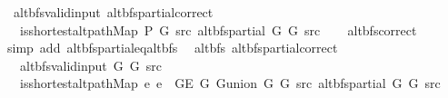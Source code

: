\begin{isabellebody}
\isamarkupfalse%
\ {\isacharparenleft}{\kern0pt}\ alt{\isacharunderscore}{\kern0pt}bfs{\isacharunderscore}{\kern0pt}valid{\isacharunderscore}{\kern0pt}input{\isacharparenright}{\kern0pt}\ alt{\isacharunderscore}{\kern0pt}bfs{\isacharunderscore}{\kern0pt}partial{\isacharunderscore}{\kern0pt}correct{\isacharcolon}{\kern0pt}\isanewline
\ \ \ {\isachardoublequoteopen}is{\isacharunderscore}{\kern0pt}shortest{\isacharunderscore}{\kern0pt}alt{\isacharunderscore}{\kern0pt}path{\isacharunderscore}{\kern0pt}Map\ P{\isacharprime}{\kern0pt}{\isacharprime}{\kern0pt}\ G\ src\ {\isacharparenleft}{\kern0pt}alt{\isacharunderscore}{\kern0pt}bfs{\isacharunderscore}{\kern0pt}partial\ G{}\ G{}\ src{\isacharparenright}{\kern0pt}{\isachardoublequoteclose}\isanewline
%
\isadelimproof
\ \ %
\endisadelimproof
%
\isatagproof
{}\isamarkupfalse%
\ alt{\isacharunderscore}{\kern0pt}bfs{\isacharunderscore}{\kern0pt}correct\isanewline
\ \ \isamarkupfalse%
\ {\isacharparenleft}{\kern0pt}simp\ add{\isacharcolon}{\kern0pt}\ alt{\isacharunderscore}{\kern0pt}bfs{\isacharunderscore}{\kern0pt}partial{\isacharunderscore}{\kern0pt}eq{\isacharunderscore}{\kern0pt}alt{\isacharunderscore}{\kern0pt}bfs{\isacharparenright}{\kern0pt}%
\endisatagproof
{\isafoldproof}%
%
\isadelimproof
\isanewline
%
\endisadelimproof
\isanewline
{}\isamarkupfalse%
\ {\isacharparenleft}{\kern0pt}\ alt{\isacharunderscore}{\kern0pt}bfs{\isacharparenright}{\kern0pt}\ alt{\isacharunderscore}{\kern0pt}bfs{\isacharunderscore}{\kern0pt}partial{\isacharunderscore}{\kern0pt}correct{\isacharcolon}{\kern0pt}\isanewline
\ \ \ {\isachardoublequoteopen}alt{\isacharunderscore}{\kern0pt}bfs{\isacharunderscore}{\kern0pt}valid{\isacharunderscore}{\kern0pt}input{\isacharprime}{\kern0pt}\ G{}\ G{}\ src{\isachardoublequoteclose}\isanewline
\ \ \ {\isachardoublequoteopen}is{\isacharunderscore}{\kern0pt}shortest{\isacharunderscore}{\kern0pt}alt{\isacharunderscore}{\kern0pt}path{\isacharunderscore}{\kern0pt}Map\ {\isacharparenleft}{\kern0pt}{\isasymlambda}e{\isachardot}{\kern0pt}\ e\ {\isasymin}\ G{\isachardot}{\kern0pt}E\ G{}{\isacharparenright}{\kern0pt}\ {\isacharparenleft}{\kern0pt}G{\isachardot}{\kern0pt}union\ G{}\ G{}{\isacharparenright}{\kern0pt}\ src\ {\isacharparenleft}{\kern0pt}alt{\isacharunderscore}{\kern0pt}bfs{\isacharunderscore}{\kern0pt}partial\ G{}\ G{}\ src{\isacharparenright}{\kern0pt}{\isachardoublequoteclose}\isanewline

\end{isabellebody}
